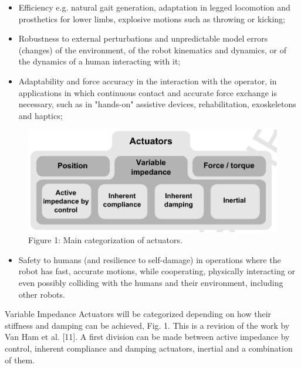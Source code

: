 \documentclass[10pt]{article}
\begin{document}
\begin{itemize}
  \item Efficiency e.g. natural gait generation, adaptation in legged locomotion and prosthetics for lower limbs, explosive motions such as throwing or kicking;
  \item Robustness to external perturbations and unpredictable model errors (changes) of the environment, of the robot kinematics and dynamics, or of the dynamics of a human interacting with it;
  \item Adaptability and force accuracy in the interaction with the operator, in applications in which continuous contact and accurate force exchange is necessary, such as in "hands-on" assistive devices, rehabilitation, exoskeletons and haptics;
\end{itemize}

\begin{figure}[h]
\begin{center}
  \includegraphics[width=\textwidth]{2025_09_17_f0417c8723605e4ad1efg-04}
\captionsetup{labelformat=empty}
\caption{Figure 1: Main categorization of actuators.}
\end{center}
\end{figure}

\begin{itemize}
  \item Safety to humans (and resilience to self-damage) in operations where the robot has fast, accurate motions, while cooperating, physically interacting or even possibly colliding with the humans and their environment, including other robots.
\end{itemize}

Variable Impedance Actuators will be categorized depending on how their stiffness and damping can be achieved, Fig. 1. This is a revision of the work by Van Ham et al. [11]. A first division can be made between active impedance by control, inherent compliance and damping actuators, inertial and a combination of them.
\end{document}
